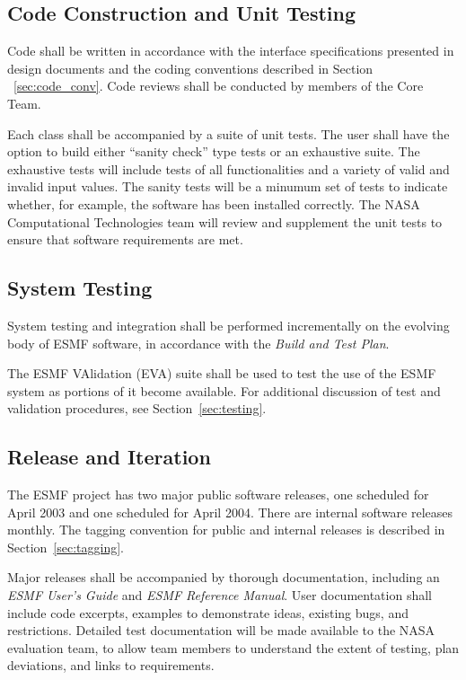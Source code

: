 \subsection {Code Construction and Unit Testing}

Code shall be written in accordance with the interface specifications
presented in design documents and the coding conventions described in 
Section ~\ref{sec:code_conv}.  Code reviews shall be conducted by members 
of the Core Team.

Each class shall be accompanied by a suite of unit tests.  The user
shall have the option to build either ``sanity check'' type tests or an 
exhaustive suite.  The exhaustive tests will include tests of all
functionalities and a variety of valid and invalid input values. The
sanity tests will be a minumum set of tests to indicate whether, for
example, the software has been installed correctly.  The NASA Computational 
Technologies team will review and supplement the unit tests to ensure 
that software requirements are met.

\subsection {System Testing }

System testing and integration shall be performed incrementally on the 
evolving body of ESMF software, in accordance with the {\it Build and Test 
Plan}.

The ESMF VAlidation (EVA) suite shall be used to test the use of the 
ESMF system as portions of it become available.  For additional discussion
of test and validation procedures, see Section~\ref{sec:testing}.

\subsection {Release and Iteration }

The ESMF project has two major public software releases, one scheduled for 
April 2003 and one scheduled for April 2004.  There are internal software 
releases monthly.  The tagging convention for public and internal releases 
is described in Section~\ref{sec:tagging}.

Major releases shall be accompanied by thorough documentation, including an 
{\it ESMF User's Guide} and {\it ESMF Reference Manual}.  User documentation
shall include code excerpts, examples to demonstrate ideas, existing bugs,
and restrictions. Detailed test documentation will be made available to
the NASA evaluation team, to allow team members to understand the extent of
testing, plan deviations, and links to requirements.

